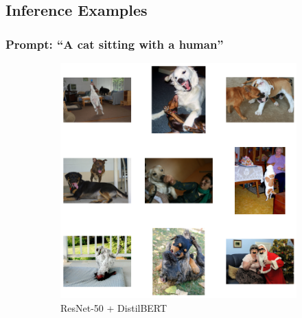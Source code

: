 \documentclass[11pt]{article}
\begin{document}
\subsection{Inference Examples}

\subsubsection{Prompt: ``A cat sitting with a human''}
\vspace{0.5em}

\begin{figure}[H]
    \centering
    \begin{subfigure}[b]{0.3\textwidth}
        \includegraphics[width=\linewidth]{Q2/A cat sitting with a human/1.png}
        \caption{\tiny ResNet-50 + DistilBERT}
    \end{subfigure}
    \hfill
    \begin{subfigure}[b]{0.3\textwidth}

\end{subfigure}
\end{figure}
\end{document}
